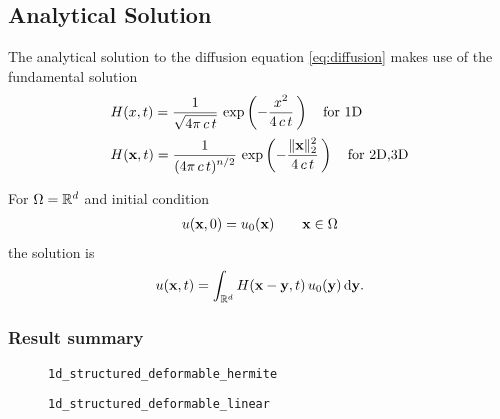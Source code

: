 \subsection{Analytical Solution}
The analytical solution to the diffusion equation \eqref{eq:diffusion} makes use of the fundamental solution
\begin{equation*}
  \begin{array}{lll}
    H(x,t) = \displaystyle\frac{\displaystyle{1}}{\displaystyle{\sqrt{4\pi\,c\,t}}}\,\exp\left(-\displaystyle\frac{\displaystyle{x^2}}{\displaystyle{4\,c\,t}}\,\right) \quad \text{for 1D}\\[4mm]
    H(\textbf{x},t) = \displaystyle\frac{\displaystyle{1}}{\displaystyle{(4\pi\,c\,t)^{n/2}}}\,\exp\left(-\displaystyle\frac{\displaystyle{\Vert \textbf{x}\Vert_2^2}}{\displaystyle{4\,c\,t}}\,\right) \quad \text{for 2D,3D}\\[4mm]
  \end{array}
\end{equation*}
For $\Omega=\mathbb{R}^d$ and initial condition
\begin{equation*}
  \begin{array}{lll}
    u(\textbf{x},0) = u_0(\textbf{x})\qquad \textbf{x} \in \Omega
  \end{array}
\end{equation*}
the solution is
\begin{equation*}
  \begin{array}{lll}
    u(\bfx,t) = \ds\int_{\R^d} H(\bfx - \bfy,t)\,u_0(\bfy)\,\d \bfy.
  \end{array}
\end{equation*}

\subsubsection{Result summary}
%
%

  \begin{figure}[h!]
    \caption{\lstinline{1d_structured_deformable_hermite}}
  \end{figure} 




%

  \begin{figure}[h!]
    \caption{\lstinline{1d_structured_deformable_linear}}
  \end{figure} 




